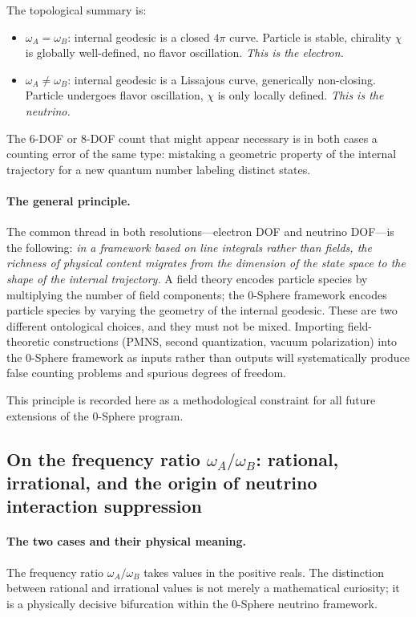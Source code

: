 \documentclass[%
 reprint, amsmath,amssymb, aps, prb, ]{revtex4-2}
\numberwithin{equation}{section}
\begin{document}
The topological summary is:
\begin{itemize}
\item $\omega_A = \omega_B$: internal geodesic is a closed $4\pi$ curve. Particle is stable, chirality $\chi$ is globally well-defined, no flavor oscillation. \emph{This is the electron.}
\item $\omega_A \neq \omega_B$: internal geodesic is a Lissajous curve, generically non-closing. Particle undergoes flavor oscillation, $\chi$ is only locally defined. \emph{This is the neutrino.}
\end{itemize}
The 6-DOF or 8-DOF count that might appear necessary is in both cases a counting error of the same type: mistaking a geometric property of the internal trajectory for a new quantum number labeling distinct states.

\paragraph{The general principle.}
The common thread in both resolutions---electron DOF and neutrino DOF---is the following: \emph{in a framework based on line integrals rather than fields, the richness of physical content migrates from the dimension of the state space to the shape of the internal trajectory.} A field theory encodes particle species by multiplying the number of field components; the 0-Sphere framework encodes particle species by varying the geometry of the internal geodesic. These are two different ontological choices, and they must not be mixed. Importing field-theoretic constructions (PMNS, second quantization, vacuum polarization) into the 0-Sphere framework as inputs rather than outputs will systematically produce false counting problems and spurious degrees of freedom.

This principle is recorded here as a methodological constraint for all future extensions of the 0-Sphere program.

\subsection{On the frequency ratio $\omega_A/\omega_B$: rational, irrational, and the origin of neutrino interaction suppression}
\label{app:reasoning_ratio}

\paragraph{The two cases and their physical meaning.}
The frequency ratio $\omega_A/\omega_B$ takes values in the positive reals. The distinction between rational and irrational values is not merely a mathematical curiosity; it is a physically decisive bifurcation within the 0-Sphere neutrino framework.
\end{document}
